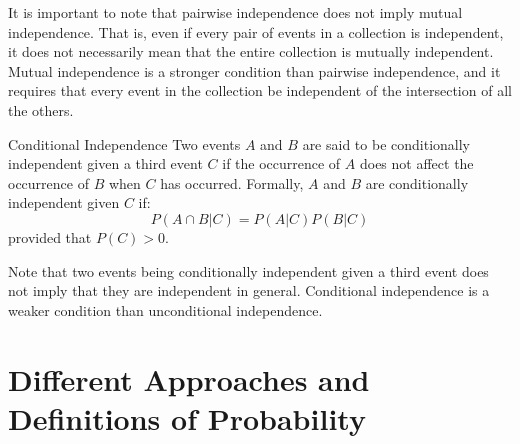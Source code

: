 \documentclass[openany]{book}
\begin{document}
\begin{mynote}
    It is important to note that pairwise independence does not imply mutual independence. That is, even if every pair of events in a collection is independent, it does not necessarily mean that the entire collection is mutually independent. Mutual independence is a stronger condition than pairwise independence, and it requires that every event in the collection be independent of the intersection of all the others.
\end{mynote}
\begin{mydefinition}{Conditional Independence}
    Two events $A$ and $B$ are said to be conditionally independent given a third event $C$ if the occurrence of $A$ does not affect the occurrence of $B$ when $C$ has occurred. Formally, $A$ and $B$ are conditionally independent given $C$ if:
    $$P(A \cap B | C) = P(A|C)P(B|C)$$
    provided that $P(C) > 0$.
\end{mydefinition}
\begin{mynote}
    Note that two events being conditionally independent given a third event does not imply that they are independent in general. Conditional independence is a weaker condition than unconditional independence.
\end{mynote}
\section{Different Approaches and Definitions of Probability}
\end{document}
